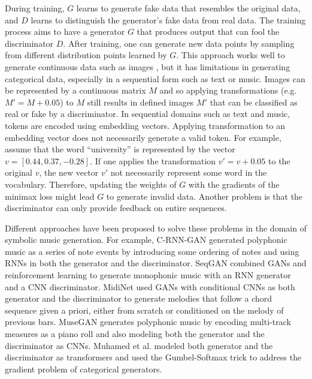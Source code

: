 During training, $G$ learns to generate fake data that resembles the original data, and $D$ learns to distinguish the generator's fake data from real data. The training process aims to have a generator $G$ that produces output that can fool the discriminator $D$. After training, one can generate new data points by sampling from different distribution points learned by $G$. This approach works well to generate continuous data such as images \cite{brock2018large}, but it has limitations in generating categorical data, especially in a sequential form such as text or music. Images can be represented by a continuous matrix $M$ and so applying transformations (e.g. $M' = M + 0.05$) to $M$ still results in defined images $M'$ that can be classified as real or fake by a discriminator. In sequential domains such as text and music, tokens are encoded using embedding vectors. Applying transformation to an embedding vector does not necessarily generate a valid token. For example, assume that the word ``university'' is represented by the vector $v = [0.44, 0.37, -0.28]$. If one applies the transformation $v' = v + 0.05$ to the original $v$, the new vector $v'$ not necessarily represent some word in the vocabulary. Therefore, updating the weights of $G$ with the gradients of the minimax loss might lead $G$ to generate invalid data. Another problem is that the discriminator can only provide feedback on entire sequences.

Different approaches have been proposed to solve these problems in the domain of symbolic music generation. For example, C-RNN-GAN \cite{yang2017midinet} generated polyphonic music as a series of note events by introducing some ordering of notes and using RNNs in both the generator and the discriminator. SeqGAN \cite{yu2017seqgan} combined GANs and reinforcement learning to generate monophonic music with an RNN generator and a CNN discriminator. MidiNet \cite{yang2017midinet} used GANs with conditional CNNs as both generator and the discriminator to generate melodies that follow a chord sequence given a priori, either from scratch or conditioned on the melody of previous bars. MuseGAN \cite{dong2018musegan} generates polyphonic music by encoding multi-track measures as a piano roll and also modeling both the generator and the discriminator as CNNs. Muhamed et al. \cite{muhamed2021symbolic} modeled both generator and the discriminator as transformers and used the Gumbel-Softmax trick \cite{jang2016categorical} to address the gradient problem of categorical generators.

